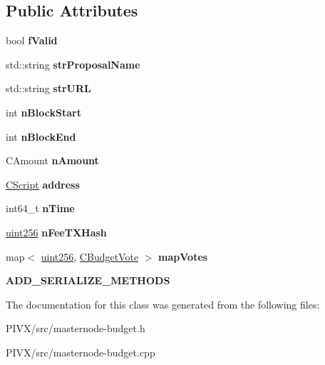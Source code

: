 \subsection*{Public Attributes}
\begin{DoxyCompactItemize}
\item 
\mbox{\label{class_c_budget_proposal_ab2222fd5e4fc51881d82b9c7dc6a0f10}} 
bool {\bfseries f\+Valid}
\item 
\mbox{\label{class_c_budget_proposal_ab881106333b75bf1a8c5c97d56cd6703}} 
std\+::string {\bfseries str\+Proposal\+Name}
\item 
\mbox{\label{class_c_budget_proposal_ac6ff1965ce0dca34221ec041ae831e83}} 
std\+::string {\bfseries str\+U\+RL}
\item 
\mbox{\label{class_c_budget_proposal_a40a5d7e56c5ef1636b48bb67e6619e32}} 
int {\bfseries n\+Block\+Start}
\item 
\mbox{\label{class_c_budget_proposal_a384863d009b95fd48d50f41891e41840}} 
int {\bfseries n\+Block\+End}
\item 
\mbox{\label{class_c_budget_proposal_ad40f0d2ff6c0bef605d405fbcb36136c}} 
C\+Amount {\bfseries n\+Amount}
\item 
\mbox{\label{class_c_budget_proposal_abec3e0b5b46ac1a8aad65b4144b87782}} 
\mbox{\hyperlink{class_c_script}{C\+Script}} {\bfseries address}
\item 
\mbox{\label{class_c_budget_proposal_a73bbfda4189ae03fdecc3d6ddf984a42}} 
int64\+\_\+t {\bfseries n\+Time}
\item 
\mbox{\label{class_c_budget_proposal_aba9937f0c86385b04d0fd5eb136ce999}} 
\mbox{\hyperlink{classuint256}{uint256}} {\bfseries n\+Fee\+T\+X\+Hash}
\item 
\mbox{\label{class_c_budget_proposal_a83239972ab9db545206ac7e59740bfab}} 
map$<$ \mbox{\hyperlink{classuint256}{uint256}}, \mbox{\hyperlink{class_c_budget_vote}{C\+Budget\+Vote}} $>$ {\bfseries map\+Votes}
\item 
\mbox{\label{class_c_budget_proposal_ad35aca18a74a65dd6df2a04536253174}} 
{\bfseries A\+D\+D\+\_\+\+S\+E\+R\+I\+A\+L\+I\+Z\+E\+\_\+\+M\+E\+T\+H\+O\+DS}
\end{DoxyCompactItemize}


The documentation for this class was generated from the following files\+:\begin{DoxyCompactItemize}
\item 
P\+I\+V\+X/src/masternode-\/budget.\+h\item 
P\+I\+V\+X/src/masternode-\/budget.\+cpp\end{DoxyCompactItemize}

